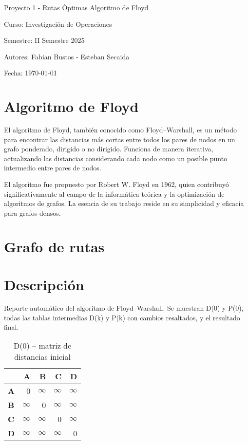 \documentclass{article}
\newcommand{\INF}{$\infty$}
\begin{document}
\begin{titlepage}
  \centering
  \vfill
  {\Huge Proyecto 1 - Rutas Òptimas Algoritmo de Floyd}\par
  \vspace{1cm}
  {\Large Curso: Investigación de Operaciones}\par
  {\Large Semestre: II Semestre 2025}\par
  \vfill
  {\Large Autores: Fabian Bustos - Esteban Secaida}\par
  \vspace{1cm}
  {\large Fecha: \today}\par
  \vfill
\end{titlepage}

\section*{Algoritmo de Floyd}
El algoritmo de Floyd, también conocido como Floyd--Warshall, es un método para encontrar las distancias más cortas entre todos los pares de nodos en un grafo ponderado, dirigido o no dirigido. Funciona de manera iterativa, actualizando las distancias considerando cada nodo como un posible punto intermedio entre pares de nodos.

El algoritmo fue propuesto por Robert W. Floyd en 1962, quien contribuyó significativamente al campo de la informática teórica y la optimización de algoritmos de grafos. La esencia de su trabajo reside en su simplicidad y eficacia para grafos densos.

\section*{Grafo de rutas}
\section*{Descripción}
Reporte automático del algoritmo de Floyd--Warshall. Se muestran D(0) y P(0), todas las tablas intermedias D(k) y P(k) con cambios resaltados, y el resultado final.

\begin{table}[H]\centering
\caption{D(0) -- matriz de distancias inicial}
\begin{tabular}{l r r r r}
\toprule
 & \textbf{A} & \textbf{B} & \textbf{C} & \textbf{D}\\\midrule
\textbf{A} & 0 & \INF & \INF & \INF \\
\textbf{B} & \INF & 0 & \INF & \INF \\
\textbf{C} & \INF & \INF & 0 & \INF \\
\textbf{D} & \INF & \INF & \INF & 0 \\
\bottomrule
\end{tabular}
\end{table}
\end{document}

